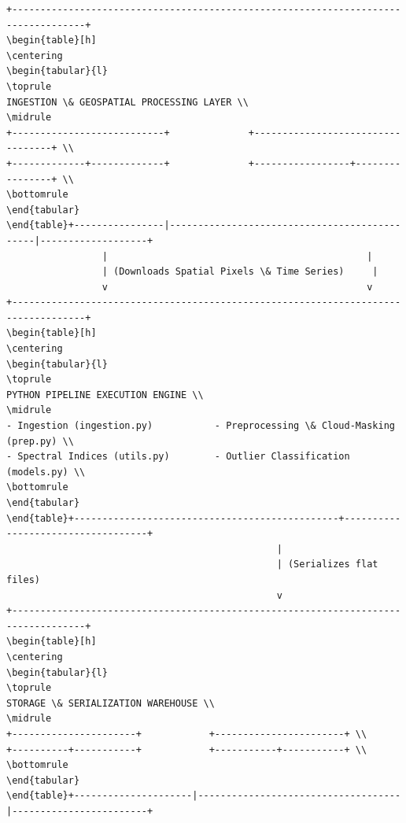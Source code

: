 \begin{verbatim}
+-----------------------------------------------------------------------------------+
\begin{table}[h]
\centering
\begin{tabular}{l}
\toprule
INGESTION \& GEOSPATIAL PROCESSING LAYER \\
\midrule
+---------------------------+              +----------------------------------+ \\
+-------------+-------------+              +-----------------+----------------+ \\
\bottomrule
\end{tabular}
\end{table}+----------------|----------------------------------------------|-------------------+
                 |                                              |
                 | (Downloads Spatial Pixels \& Time Series)     |
                 v                                              v
+-----------------------------------------------------------------------------------+
\begin{table}[h]
\centering
\begin{tabular}{l}
\toprule
PYTHON PIPELINE EXECUTION ENGINE \\
\midrule
- Ingestion (ingestion.py)           - Preprocessing \& Cloud-Masking (prep.py) \\
- Spectral Indices (utils.py)        - Outlier Classification (models.py) \\
\bottomrule
\end{tabular}
\end{table}+-----------------------------------------------+-----------------------------------+
                                                |
                                                | (Serializes flat files)
                                                v
+-----------------------------------------------------------------------------------+
\begin{table}[h]
\centering
\begin{tabular}{l}
\toprule
STORAGE \& SERIALIZATION WAREHOUSE \\
\midrule
+----------------------+            +-----------------------+ \\
+----------+-----------+            +-----------+-----------+ \\
\bottomrule
\end{tabular}
\end{table}+---------------------|------------------------------------|------------------------+

\end{verbatim}
